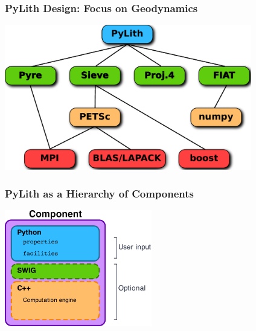 \documentclass{beamer}
\begin{document}
\begin{frame}
  \frametitle{PyLith Design: Focus on Geodynamics}

  \vfill
  \begin{center}
    \includegraphics[height=2.5in]{figs/packages}
  \end{center}  
  \vfill

\end{frame}


\begin{frame}
  \frametitle{PyLith as a Hierarchy of Components}

  \vfill
  \begin{center}
    \includegraphics[height=2.0in]{figs/component}
  \end{center}  
  \vfill

\end{frame}
\end{document}
